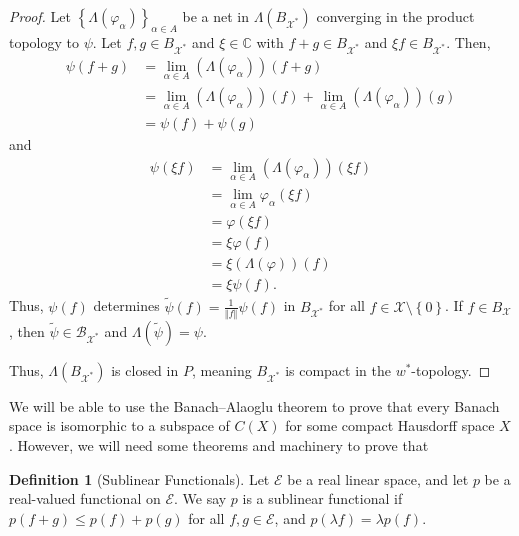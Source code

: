 \documentclass[10pt]{extarticle}
\newcommand{\C}{\mathbb{C}}
\newcommand{\norm}[1]{\left\Vert #1\right\Vert}
\newcommand{\set}[1]{\left\{#1\right\}}
\theoremstyle{plain}
\theoremstyle{definition}
\newtheorem*{definition}{Definition}
\theoremstyle{note}
\renewcommand{\newline}{\hfill\break}
\begin{document}
\begin{proof}
  Let $\set{\Lambda\left(\varphi_{\alpha}\right)}_{\alpha\in A}$ be a net in $\Lambda\left(B_{\mathcal{X}^{\ast}}\right)$ converging in the product topology to $\psi$. Let $f,g \in B_{\mathcal{X}^{\ast}}$ and $\xi \in \C$ with $f+g\in B_{\mathcal{X}^{\ast}}$ and $\xi f \in B_{\mathcal{X}^{\ast}}$. Then,
  \begin{align*}
    \psi\left(f+g\right) &= \lim_{\alpha \in A}\left(\Lambda\left(\varphi_{\alpha}\right)\right)(f+g)\\
                         &= \lim_{\alpha \in A}\left(\Lambda\left(\varphi_{\alpha}\right)\right)(f) + \lim_{\alpha \in A}\left(\Lambda\left(\varphi_{\alpha}\right)\right)(g)\\
                         &= \psi(f) + \psi(g)
  \end{align*}
  and
  \begin{align*}
    \psi(\xi f) &= \lim_{\alpha \in A}\left(\Lambda\left(\varphi_{\alpha}\right)\right)(\xi f)\\
                 &= \lim_{\alpha \in A}\varphi_{\alpha}\left(\xi f\right)\\
                 &= \varphi\left(\xi f\right)\\
                 &= \xi \varphi\left(f\right)\\
                 &= \xi \left(\Lambda\left(\varphi\right)\right)(f)\\
                 &= \xi \psi(f).
  \end{align*}
  Thus, $\psi(f)$ determines $\tilde{\psi}(f) = \frac{1}{\norm{f}}\psi\left(f\right)$ in $B_{\mathcal{X}^{\ast}}$ for all $f\in \mathcal{X}\setminus \set{0}$. If $f\in B_{\mathcal{X}}$, then $\tilde{\psi} \in \mathcal{B}_{\mathcal{X}^{\ast}}$ and $\Lambda(\tilde{\psi}) = \psi$.\newline

  Thus, $\Lambda\left(B_{\mathcal{X}^{\ast}}\right)$ is closed in $P$, meaning $B_{\mathcal{X}^{\ast}}$ is compact in the $w^{\ast}$-topology.
\end{proof}
We will be able to use the Banach--Alaoglu theorem to prove that every Banach space is isomorphic to a subspace of $C(X)$ for some compact Hausdorff space $X$. However, we will need some theorems and machinery to prove that
\begin{definition}[Sublinear Functionals]
  Let $\mathcal{E}$ be a real linear space, and let $p$ be a real-valued functional on $\mathcal{E}$. We say $p$ is a sublinear functional if $p(f+g)\leq p(f) + p(g)$ for all $f,g\in \mathcal{E}$, and $p(\lambda f) = \lambda p(f)$.
\end{definition}
\end{document}
